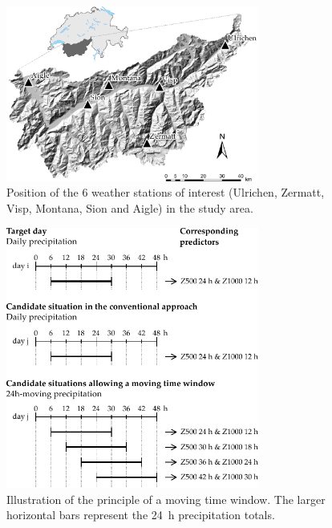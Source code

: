 \documentclass[hess, manuscript]{copernicus}
\begin{document}






\begin{figure}[htb]
	\begin{center}
		\includegraphics[width=8.3cm]{figures/figure_map.pdf}
	\end{center}
	\caption{Position of the 6 weather stations of interest (Ulrichen, Zermatt, Visp, Montana, Sion and Aigle) in the study area.}
	\label{fig:map}
\end{figure}

\begin{figure}[htb]
	\begin{center}
		\includegraphics[width=8.3cm]{figures/illustration_moving_window.pdf}
	\end{center}
	\caption{Illustration of the principle of a moving time window. The larger horizontal bars represent the 24~h precipitation totals.}
	\label{fig:principle}
\end{figure}
\end{document}
